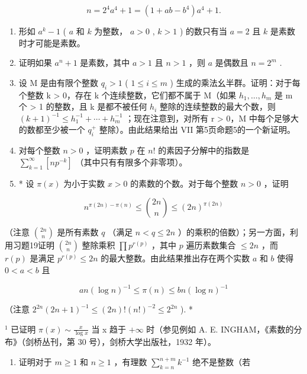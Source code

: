 \[
n = 2 ^ {4} a ^ {4} + 1 = (1 + a b - b ^ {4}) a ^ {4} + 1.
\]

\begin{enumerate}
\def\labelenumi{\arabic{enumi})}
\setcounter{enumi}{15}
\item
  形如 \(a^k - 1\) ( \(a\) 和 \(k\) 为整数， \(a > 0\) , \(k > 1\) ) 的数只有当 \(a = 2\) 且 \(k\) 是素数时才可能是素数。
\item
  证明如果 \(a^n + 1\) 是素数，其中 \(a > 1\) 且 \(n > 1\) ，则 \(a\) 是偶数且 \(n = 2^m\) .
\item
  设 M 是由有限个整数 \(q_{i} > 1\) ( \(1 \leqslant i \leqslant m\) ) 生成的乘法幺半群。证明：对于每个整数 k \textgreater{} 0，存在 k 个连续整数，它们都不属于 M（如果 \(h_{1}, \ldots, h_{m}\) 是 m 个 \textgreater{} 1 的整数，且 k 是都不被任何 \(h_{i}\) 整除的连续整数的最大个数，则 \((k + 1)^{-1} \leqslant h_{1}^{-1} + \cdots + h_{m}^{-1}\) ；现在注意到，对所有 r \textgreater{} 0，M 中每个足够大的数都至少被一个 \(q_{i}^{+}\) 整除）。由此结果给出 VII 第5页命题5的一个新证明。
\item
  对每个整数 \(n > 0\) ，证明素数 \(p\) 在 \(n!\) 的素因子分解中的指数是 \(\sum_{k=1}^{\infty} [np^{-k}]\) （其中只有有限多个非零项）。
\item
  * 设 \(\pi(x)\) 为小于实数 \(x > 0\) 的素数的个数。对于每个整数 \(n > 0\) ，证明
\end{enumerate}

\[
n ^ {\pi (2 n) - \pi (n)} \leqslant \binom {2 n} {n} \leqslant (2 n) ^ {\pi (2 n)}
\]

（注意 \(\binom{2n}{n}\) 是所有素数 \(q\) （满足 \(n < q \leqslant 2n\) ）的乘积的倍数）；另一方面，利用习题19证明 \(\binom{2n}{n}\) 整除乘积 \(\prod p^{r(p)}\) ，其中 \(p\) 遍历素数集合 \(\leqslant 2n\) ，而 \(r(p)\) 是满足 \(p^{r(p)} \leqslant 2n\) 的最大整数。由此结果推出存在两个实数 \(a\) 和 \(b\) 使得 \(0 < a < b\) 且

\[
a n (\log n) ^ {- 1} \leqslant \pi (n) \leqslant b n (\log n) ^ {- 1}
\]

（注意 \(2^{2n}(2n + 1)^{-1} \leqslant (2n)! (n!)^{-2} \leqslant 2^{2n}\) ). *

\(^{1}\) 已证明 \(\pi(x) \sim \frac{x}{\log x}\) 当 x 趋于 \(+\infty\) 时（参见例如 A. E. INGHAM，《素数的分布》（剑桥丛刊，第 30 号），剑桥大学出版社，1932 年）。

\begin{enumerate}
\def\labelenumi{\arabic{enumi})}
\setcounter{enumi}{20}
\tightlist
\item
  证明对于 \(m \geqslant 1\) 和 \(n \geqslant 1\) ，有理数 \(\sum_{k=n}^{n+m} k^{-1}\) 绝不是整数（若
\end{enumerate}

